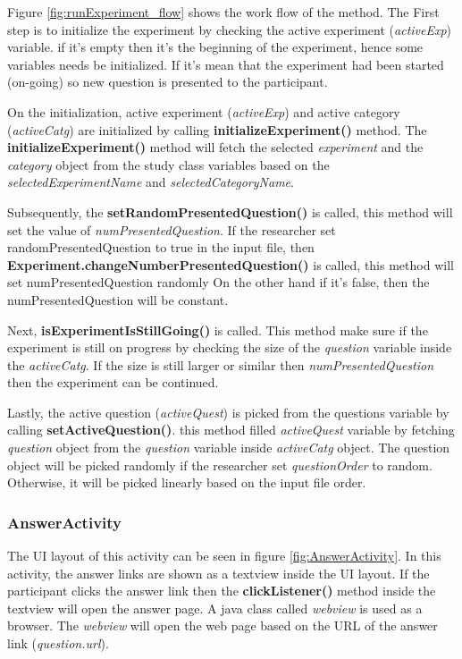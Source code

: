 Figure \ref{fig:runExperiment_flow} shows the work flow of the method. The First step is to initialize the experiment by checking the active experiment (\textit{activeExp}) variable.
   if it's empty then it's the beginning of the experiment, hence some variables needs be initialized. If it's mean that the experiment had been started (on-going)
 so new question is presented to the participant.


On the initialization, active experiment (\textit{activeExp}) and active category (\textit{activeCatg}) are initialized by calling \textbf{initializeExperiment()} method.
The \textbf{initializeExperiment()} method will fetch the selected \textit{experiment} and the
\textit{category} object from the study class variables based on the \textit{selectedExperimentName} and \textit{selectedCategoryName}.


Subsequently, the \textbf{setRandomPresentedQuestion()} is called, this method will set the value of \textit{numPresentedQuestion}.
If the researcher set randomPresentedQuestion to true in the input file, then \textbf{Experiment.changeNumberPresentedQuestion()} is called, this method will set numPresentedQuestion randomly
On the other hand if it's false, then the numPresentedQuestion will be constant.

Next, \textbf{isExperimentIsStillGoing()} is called. This method make sure if the experiment is still on progress by checking the size of the
\textit{question} variable inside the \textit{activeCatg}. If the size is still larger or similar then \textit{numPresentedQuestion} then the experiment can be continued.

Lastly, the active question (\textit{activeQuest}) is picked from the questions variable by calling \textbf{setActiveQuestion()}. this method filled
 \textit{activeQuest} variable by fetching \textit{question} object from the \textit{question} variable inside \textit{activeCatg} object.
  The question object will be picked randomly if the researcher set \textit{questionOrder} to random. Otherwise, it will be picked linearly based on
  the input file order.


\subsubsection{AnswerActivity}
The UI layout of this activity can be seen in figure \ref{fig:AnswerActivity}.
In this activity, the answer links are shown as a textview inside the UI layout. If the participant clicks the answer
link then the \textbf{clickListener()} method inside the textview will open the answer page.
A java class called \textit{webview} is used as a browser. The \textit{webview} will open the web page based on the URL of the answer link (\textit{question.url}).

